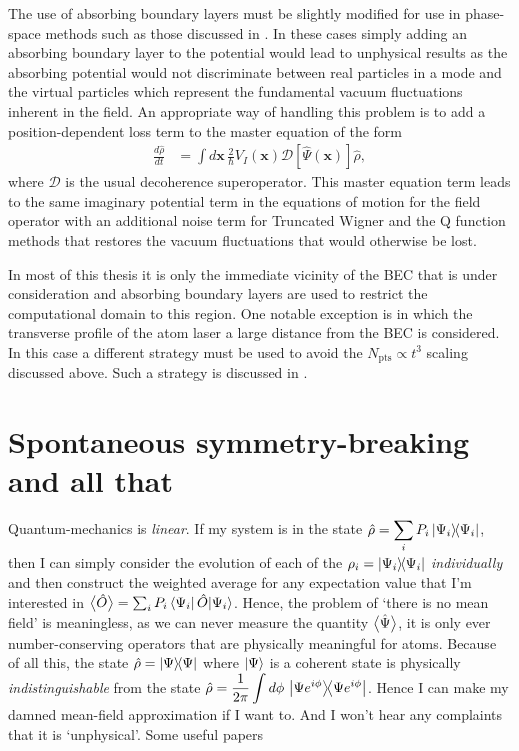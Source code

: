 The use of absorbing boundary layers must be slightly modified for use in phase-space methods such as those discussed in . In these cases simply adding an absorbing boundary layer to the potential would lead to unphysical results as the absorbing potential would not discriminate between real particles in a mode and the virtual particles which represent the fundamental vacuum fluctuations inherent in the field. An appropriate way of handling this problem is to add a position-dependent loss term to the master equation of the form
\begin{align}
    \label{BackgroundTheory:PhaseSpaceAbsorbingBoundaryLayer}
    \frac{d \hat{\rho}}{dt} &= \int d \bm{x}\, \frac{2}{\hbar}V_I(\bm{x})\mathcal{D}[\hat{\Psi}(\bm{x})]\hat{\rho},
\end{align}
where $\mathcal{D}$ is the usual decoherence superoperator. This master equation term leads to the same imaginary potential term in the equations of motion for the field operator with an additional noise term for Truncated Wigner and the Q function methods that restores the vacuum fluctuations that would otherwise be lost.

\parasep

In most of this thesis it is only the immediate vicinity of the BEC that is under consideration and absorbing boundary layers are used to restrict the computational domain to this region. One notable exception is  in which the transverse profile of the atom laser a large distance from the BEC is considered. In this case a different strategy must be used to avoid the $N_\text{pts} \propto t^3$ scaling discussed above. Such a strategy is discussed in .

\section{Spontaneous symmetry-breaking and all that}
\label{BackgroundTheory:SymmetryBreaking}

Quantum-mechanics is \emph{linear}. If my system is in the state $\displaystyle \hat{\rho} = \sum_i P_i \left|\Psi_i\middle>\!\middle<\Psi_i\right|$, then I can simply consider the evolution of each of the $\displaystyle \rho_i = \left|\Psi_i\middle>\!\middle<\Psi_i\right|$ \emph{individually} and then construct the weighted average for any expectation value that I'm interested in ${\big<\hat{O}\big>} = \sum_i P_i \left<\Psi_i\right|\hat{O}{\left|\Psi_i\right>}$. Hence, the problem of `there is no mean field' is meaningless, as we can never measure the quantity ${\big<\hat{\Psi}\big>}$, it is only ever number-conserving operators that are physically meaningful for atoms. Because of all this, the state $\hat{\rho} = \left|\Psi\middle>\!\middle<\Psi\right|$ where ${\left|\Psi\right>}$ is a coherent state is physically \emph{indistinguishable} from the state $\displaystyle \hat{\rho} = \frac{1}{2\pi}\int d\phi\, \left|\Psi e^{i\phi}\middle>\!\middle<\Psi e^{i\phi}\right|$. Hence I can make my damned mean-field approximation if I want to. And I won't hear any complaints that it is `unphysical'. Some useful papers \citep{Leggett:1991fj,Molmer:1997fr}

